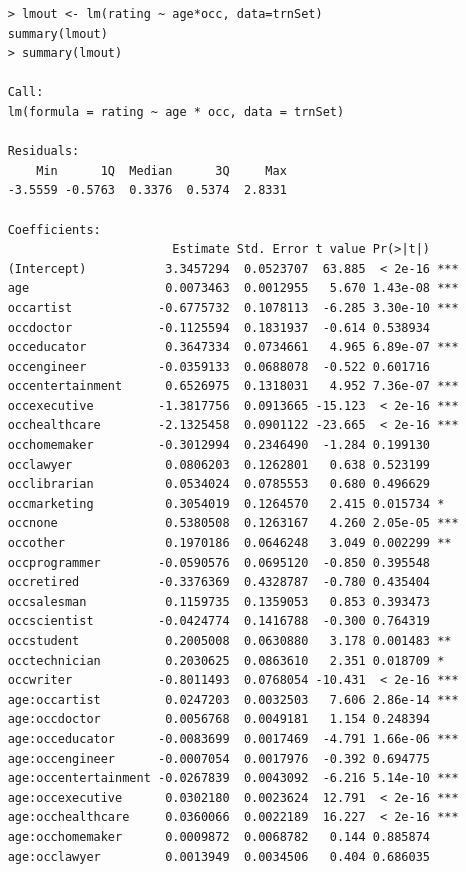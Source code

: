 \documentclass[11pt]{article}
\begin{document}
\begin{verbatim}
    > lmout <- lm(rating ~ age*occ, data=trnSet)
    summary(lmout)
    > summary(lmout)
    
    Call:
    lm(formula = rating ~ age * occ, data = trnSet)
    
    Residuals:
        Min      1Q  Median      3Q     Max 
    -3.5559 -0.5763  0.3376  0.5374  2.8331 
    
    Coefficients:
                           Estimate Std. Error t value Pr(>|t|)    
    (Intercept)           3.3457294  0.0523707  63.885  < 2e-16 ***
    age                   0.0073463  0.0012955   5.670 1.43e-08 ***
    occartist            -0.6775732  0.1078113  -6.285 3.30e-10 ***
    occdoctor            -0.1125594  0.1831937  -0.614 0.538934    
    occeducator           0.3647334  0.0734661   4.965 6.89e-07 ***
    occengineer          -0.0359133  0.0688078  -0.522 0.601716    
    occentertainment      0.6526975  0.1318031   4.952 7.36e-07 ***
    occexecutive         -1.3817756  0.0913665 -15.123  < 2e-16 ***
    occhealthcare        -2.1325458  0.0901122 -23.665  < 2e-16 ***
    occhomemaker         -0.3012994  0.2346490  -1.284 0.199130    
    occlawyer             0.0806203  0.1262801   0.638 0.523199    
    occlibrarian          0.0534024  0.0785553   0.680 0.496629    
    occmarketing          0.3054019  0.1264570   2.415 0.015734 *  
    occnone               0.5380508  0.1263167   4.260 2.05e-05 ***
    occother              0.1970186  0.0646248   3.049 0.002299 ** 
    occprogrammer        -0.0590576  0.0695120  -0.850 0.395548    
    occretired           -0.3376369  0.4328787  -0.780 0.435404    
    occsalesman           0.1159735  0.1359053   0.853 0.393473    
    occscientist         -0.0424774  0.1416788  -0.300 0.764319    
    occstudent            0.2005008  0.0630880   3.178 0.001483 ** 
    occtechnician         0.2030625  0.0863610   2.351 0.018709 *  
    occwriter            -0.8011493  0.0768054 -10.431  < 2e-16 ***
    age:occartist         0.0247203  0.0032503   7.606 2.86e-14 ***
    age:occdoctor         0.0056768  0.0049181   1.154 0.248394    
    age:occeducator      -0.0083699  0.0017469  -4.791 1.66e-06 ***
    age:occengineer      -0.0007054  0.0017976  -0.392 0.694775    
    age:occentertainment -0.0267839  0.0043092  -6.216 5.14e-10 ***
    age:occexecutive      0.0302180  0.0023624  12.791  < 2e-16 ***
    age:occhealthcare     0.0360066  0.0022189  16.227  < 2e-16 ***
    age:occhomemaker      0.0009872  0.0068782   0.144 0.885874    
    age:occlawyer         0.0013949  0.0034506   0.404 0.686035    

\end{verbatim}
\end{document}

